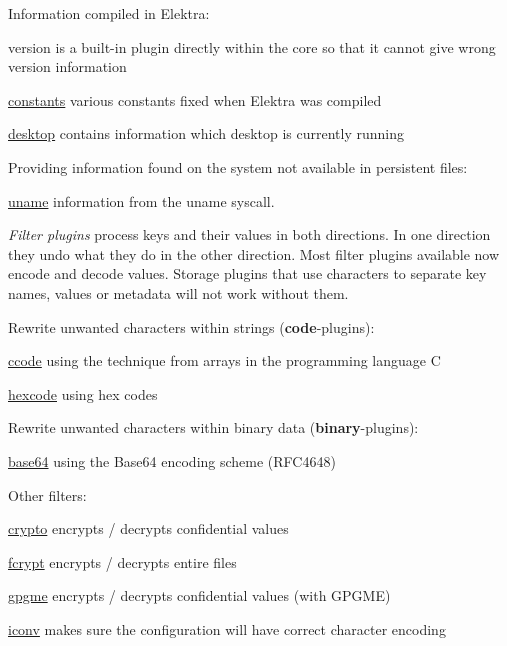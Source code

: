 Information compiled in Elektra\+:


\begin{DoxyItemize}
\item version is a built-\/in plugin directly within the core so that it cannot give wrong version information
\item \hyperlink{autotoc_md102_src_plugins_constants_README_md}{constants} various constants fixed when Elektra was compiled
\item \hyperlink{autotoc_md170_src_plugins_desktop_README_md}{desktop} contains information which desktop is currently running
\end{DoxyItemize}

Providing information found on the system not available in persistent files\+:


\begin{DoxyItemize}
\item \hyperlink{autotoc_md759_src_plugins_uname_README_md}{uname} information from the uname syscall.
\end{DoxyItemize}

{\itshape Filter plugins} process keys and their values in both directions. In one direction they undo what they do in the other direction. Most filter plugins available now encode and decode values. Storage plugins that use characters to separate key names, values or metadata will not work without them.

Rewrite unwanted characters within strings ({\bfseries code}-\/plugins)\+:


\begin{DoxyItemize}
\item \hyperlink{autotoc_md79_src_plugins_ccode_README_md}{ccode} using the technique from arrays in the programming language C
\item \hyperlink{autotoc_md257_src_plugins_hexcode_README_md}{hexcode} using hex codes
\end{DoxyItemize}

Rewrite unwanted characters within binary data ({\bfseries binary}-\/plugins)\+:


\begin{DoxyItemize}
\item \hyperlink{autotoc_md51_src_plugins_base64_README_md}{base64} using the Base64 encoding scheme (R\+F\+C4648)
\end{DoxyItemize}

Other filters\+:


\begin{DoxyItemize}
\item \hyperlink{autotoc_md109_src_plugins_crypto_README_md}{crypto} encrypts / decrypts confidential values
\item \hyperlink{autotoc_md203_src_plugins_fcrypt_README_md}{fcrypt} encrypts / decrypts entire files
\item \hyperlink{autotoc_md248_src_plugins_gpgme_README_md}{gpgme} encrypts / decrypts confidential values (with G\+P\+G\+ME)
\item \hyperlink{autotoc_md283_src_plugins_iconv_README_md}{iconv} makes sure the configuration will have correct character encoding
\end{DoxyItemize}

